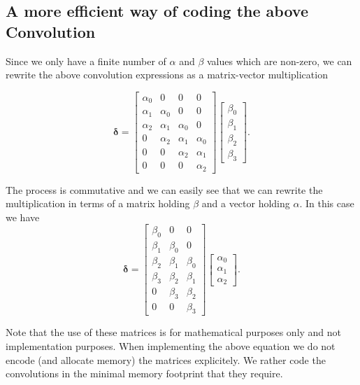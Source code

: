 \documentclass[%
oneside,                 %
final,                   %
10pt]{article}
\begin{document}
\subsection*{A more efficient way of coding the above Convolution}

Since we only have a finite number of $\alpha$ and $\beta$ values
which are non-zero, we can rewrite the above convolution expressions
as a matrix-vector multiplication

\[
\bm{\delta}=\begin{bmatrix}\alpha_0 & 0 & 0 & 0 \\
                            \alpha_1 & \alpha_0 & 0 & 0 \\
			    \alpha_2 & \alpha_1 & \alpha_0 & 0 \\
			    0 & \alpha_2 & \alpha_1 & \alpha_0 \\
			    0 & 0 & \alpha_2 & \alpha_1 \\
			    0 & 0 & 0 & \alpha_2
			    \end{bmatrix}\begin{bmatrix} \beta_0 \\ \beta_1 \\ \beta_2 \\ \beta_3\end{bmatrix}.
\]

The process is commutative and we can easily see that we can rewrite the multiplication in terms of  a matrix holding $\beta$ and a vector holding $\alpha$.
In this case we have
\[
\bm{\delta}=\begin{bmatrix}\beta_0 & 0 & 0  \\
                            \beta_1 & \beta_0 & 0  \\
			    \beta_2 & \beta_1 & \beta_0  \\
			    \beta_3 & \beta_2 & \beta_1 \\
			    0 & \beta_3 & \beta_2 \\
			    0 & 0 & \beta_3
			    \end{bmatrix}\begin{bmatrix} \alpha_0 \\ \alpha_1 \\ \alpha_2\end{bmatrix}.
\]

Note that the use of these matrices is for mathematical purposes only
and not implementation purposes.  When implementing the above equation
we do not encode (and allocate memory) the matrices explicitely.  We
rather code the convolutions in the minimal memory footprint that they
require.
\end{document}
